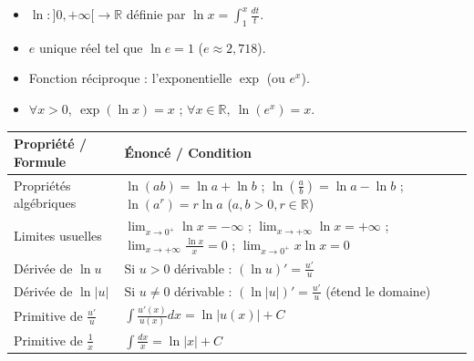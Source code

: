 \documentclass[11pt]{article}
\begin{document}
\begin{definition}
\begin{itemize}
  \item $\ln : ]0,+\infty[ \to \mathbb{R}$ définie par $\ln x = \int_1^x \frac{dt}{t}$.
  \item $e$ unique réel tel que $\ln e = 1$ ($e \approx 2,718$).
  \item Fonction réciproque : l'exponentielle $\exp$ (ou $e^x$).
  \item $\forall x>0,\ \exp(\ln x)=x$ ; $\forall x\in\mathbb{R},\ \ln(e^x)=x$.
\end{itemize}
\end{definition}

\begin{propriete}
\begin{center}
\begin{tabularx}{\linewidth}{|l|X|}\hline
\rowcolor{popblueL} \textbf{Propriété / Formule} & \textbf{Énoncé / Condition} \\ \hline
Propriétés algébriques & $\ln(ab)=\ln a+\ln b$ ; $\ln(\frac{a}{b})=\ln a-\ln b$ ; $\ln(a^r)=r\ln a$ ($a,b>0, r\in\mathbb{R}$) \\ \hline
Limites usuelles & $\lim_{x\to 0^+}\ln x=-\infty$ ; $\lim_{x\to+\infty}\ln x=+\infty$ ; $\lim_{x\to+\infty}\frac{\ln x}{x}=0$ ; $\lim_{x\to 0^+}x\ln x=0$ \\ \hline
Dérivée de $\ln u$ & Si $u>0$ dérivable : $(\ln u)' = \frac{u'}{u}$ \\ \hline
Dérivée de $\ln|u|$ & Si $u\neq 0$ dérivable : $(\ln|u|)' = \frac{u'}{u}$ (étend le domaine) \\ \hline
Primitive de $\frac{u'}{u}$ & $\int \frac{u'(x)}{u(x)}dx = \ln|u(x)| + C$ \\ \hline
Primitive de $\frac{1}{x}$ & $\int \frac{dx}{x} = \ln|x| + C$ \\ \hline
\end{tabularx}
\end{center}
\end{propriete}
\end{document}
